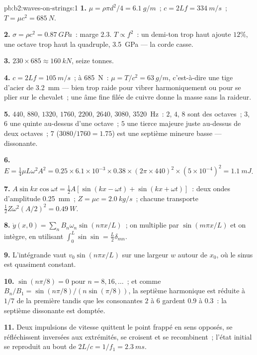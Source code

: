 \begin{solution}{pb:b2:waves-on-strings:1}
\textbf{1.} $\mu = \rho\pi d^2/4 = \qty{6.1}{g/m}$~; $c = 2Lf = \qty{334}{m/s}$~; $T = \mu c^2
= \qty{685}{N}$.

\textbf{2.} $\sigma = \rho c^2 = \qty{0.87}{GPa}$~: marge $2.3$. $T \propto f^2$~: un
demi-ton trop haut ajoute $12\%$, une octave trop haut la quadruple,
\qty{3.5}{GPa} --- la corde casse.

\textbf{3.} $230 \times 685 \approx \qty{160}{kN}$, seize tonnes.

\textbf{4.} $c = 2Lf = \qty{105}{m/s}$~; à \qty{685}{N}~: $\mu = T/c^2 = \qty{63}{g/m}$,
c'est-à-dire une tige d'acier de \qty{3.2}{mm} --- bien trop raide pour vibrer
harmoniquement ou pour se plier sur le chevalet~; une âme fine filée de cuivre
donne la masse sans la raideur.

\textbf{5.} $440$, $880$, $1320$, $1760$, $2200$, $2640$, $3080$, \qty{3520}{Hz}~: $2$,
$4$, $8$ sont des octaves~; $3$, $6$ une quinte au-dessus d'une octave~; $5$ une tierce
majeure juste au-dessus de deux octaves~; $7$ ($3080/1760 = 1.75$) est une septième
mineure basse --- dissonante.

\textbf{6.} $E = \tfrac14\mu L\omega^2A^2 = 0.25 \times 6.1 \times 10^{-3} \times 0.38 \times (2\pi
\times 440)^2 \times (5 \times 10^{-4})^2 = \qty{1.1}{mJ}$.

\textbf{7.} $A\sin kx\cos\omega t = \tfrac12A[\sin(kx - \omega t) + \sin(kx + \omega t)]$~: deux
ondes d'amplitude \qty{0.25}{mm}~; $Z = \mu c = \qty{2.0}{kg/s}$~; chacune transporte
$\tfrac12Z\omega^2(A/2)^2 = \qty{0.49}{W}$.

\textbf{8.} $\dot y(x, 0) = \sum_nB_n\omega_n\sin(n\pi x/L)$~; on multiplie par
$\sin(m\pi x/L)$ et on intègre, en utilisant $\int_0^L\sin\sin = \tfrac L2\delta_{mn}$.

\textbf{9.} L'intégrande vaut $v_0\sin(n\pi x/L)$ sur une largeur $w$ autour de $x_0$,
où le sinus est quasiment constant.

\textbf{10.} $\sin(n\pi/8) = 0$ pour $n = 8, 16, \dots$~; et comme $B_n/B_1 =
\sin(n\pi/8)/(n\sin(\pi/8))$, la septième harmonique est réduite à $1/7$ de la
première tandis que les consonantes $2$ à $6$ gardent $0.9$ à $0.3$~: la septième
dissonante est domptée.

\textbf{11.} Deux impulsions de vitesse quittent le point frappé en sens
opposés, se réfléchissent inversées aux extrémités, se croisent et se recombinent~; l'état
initial se reproduit au bout de $2L/c = 1/f_1 = \qty{2.3}{ms}$.


\end{solution}
